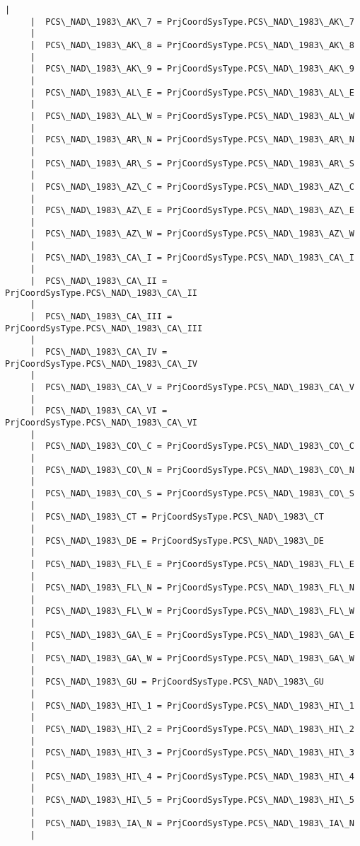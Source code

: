 \documentclass[11pt]{article}
\begin{document}
\begin{Verbatim}[commandchars=\\\{\}]
     |  
     |  PCS\_NAD\_1983\_AK\_7 = PrjCoordSysType.PCS\_NAD\_1983\_AK\_7
     |  
     |  PCS\_NAD\_1983\_AK\_8 = PrjCoordSysType.PCS\_NAD\_1983\_AK\_8
     |  
     |  PCS\_NAD\_1983\_AK\_9 = PrjCoordSysType.PCS\_NAD\_1983\_AK\_9
     |  
     |  PCS\_NAD\_1983\_AL\_E = PrjCoordSysType.PCS\_NAD\_1983\_AL\_E
     |  
     |  PCS\_NAD\_1983\_AL\_W = PrjCoordSysType.PCS\_NAD\_1983\_AL\_W
     |  
     |  PCS\_NAD\_1983\_AR\_N = PrjCoordSysType.PCS\_NAD\_1983\_AR\_N
     |  
     |  PCS\_NAD\_1983\_AR\_S = PrjCoordSysType.PCS\_NAD\_1983\_AR\_S
     |  
     |  PCS\_NAD\_1983\_AZ\_C = PrjCoordSysType.PCS\_NAD\_1983\_AZ\_C
     |  
     |  PCS\_NAD\_1983\_AZ\_E = PrjCoordSysType.PCS\_NAD\_1983\_AZ\_E
     |  
     |  PCS\_NAD\_1983\_AZ\_W = PrjCoordSysType.PCS\_NAD\_1983\_AZ\_W
     |  
     |  PCS\_NAD\_1983\_CA\_I = PrjCoordSysType.PCS\_NAD\_1983\_CA\_I
     |  
     |  PCS\_NAD\_1983\_CA\_II = PrjCoordSysType.PCS\_NAD\_1983\_CA\_II
     |  
     |  PCS\_NAD\_1983\_CA\_III = PrjCoordSysType.PCS\_NAD\_1983\_CA\_III
     |  
     |  PCS\_NAD\_1983\_CA\_IV = PrjCoordSysType.PCS\_NAD\_1983\_CA\_IV
     |  
     |  PCS\_NAD\_1983\_CA\_V = PrjCoordSysType.PCS\_NAD\_1983\_CA\_V
     |  
     |  PCS\_NAD\_1983\_CA\_VI = PrjCoordSysType.PCS\_NAD\_1983\_CA\_VI
     |  
     |  PCS\_NAD\_1983\_CO\_C = PrjCoordSysType.PCS\_NAD\_1983\_CO\_C
     |  
     |  PCS\_NAD\_1983\_CO\_N = PrjCoordSysType.PCS\_NAD\_1983\_CO\_N
     |  
     |  PCS\_NAD\_1983\_CO\_S = PrjCoordSysType.PCS\_NAD\_1983\_CO\_S
     |  
     |  PCS\_NAD\_1983\_CT = PrjCoordSysType.PCS\_NAD\_1983\_CT
     |  
     |  PCS\_NAD\_1983\_DE = PrjCoordSysType.PCS\_NAD\_1983\_DE
     |  
     |  PCS\_NAD\_1983\_FL\_E = PrjCoordSysType.PCS\_NAD\_1983\_FL\_E
     |  
     |  PCS\_NAD\_1983\_FL\_N = PrjCoordSysType.PCS\_NAD\_1983\_FL\_N
     |  
     |  PCS\_NAD\_1983\_FL\_W = PrjCoordSysType.PCS\_NAD\_1983\_FL\_W
     |  
     |  PCS\_NAD\_1983\_GA\_E = PrjCoordSysType.PCS\_NAD\_1983\_GA\_E
     |  
     |  PCS\_NAD\_1983\_GA\_W = PrjCoordSysType.PCS\_NAD\_1983\_GA\_W
     |  
     |  PCS\_NAD\_1983\_GU = PrjCoordSysType.PCS\_NAD\_1983\_GU
     |  
     |  PCS\_NAD\_1983\_HI\_1 = PrjCoordSysType.PCS\_NAD\_1983\_HI\_1
     |  
     |  PCS\_NAD\_1983\_HI\_2 = PrjCoordSysType.PCS\_NAD\_1983\_HI\_2
     |  
     |  PCS\_NAD\_1983\_HI\_3 = PrjCoordSysType.PCS\_NAD\_1983\_HI\_3
     |  
     |  PCS\_NAD\_1983\_HI\_4 = PrjCoordSysType.PCS\_NAD\_1983\_HI\_4
     |  
     |  PCS\_NAD\_1983\_HI\_5 = PrjCoordSysType.PCS\_NAD\_1983\_HI\_5
     |  
     |  PCS\_NAD\_1983\_IA\_N = PrjCoordSysType.PCS\_NAD\_1983\_IA\_N
     |  

\end{Verbatim}
\end{document}
